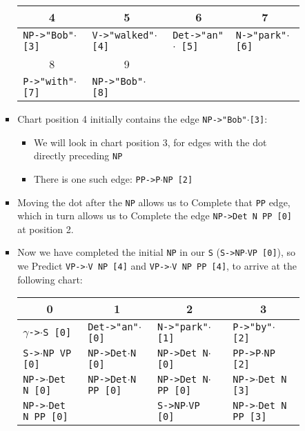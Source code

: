 \documentclass[a4paper]{article}
\begin{document}
\begin{enumerate}
\begin{enumerate}
\begin{enumerate}
\begin{itemize}
\begin{table}[ht]
\begin{tabular}{l|l|l|l}
\hline
\multicolumn{1}{c}{4} & \multicolumn{1}{c}{5} & \multicolumn{1}{c}{6} & \multicolumn{1}{c}{7} \\
\hline
\texttt{NP->"Bob"}$\cdot$\texttt{ [3]} & \texttt{V->"walked"}$\cdot$\texttt{ [4]} & \texttt{Det->"an"}$\cdot$\texttt{ [5]} & \texttt{N->"park"}$\cdot$\texttt{ [6]} \\
\hline
\multicolumn{1}{c}{8} & \multicolumn{1}{c}{9} & \multicolumn{1}{c}{} & \\
\hline
\texttt{P->"with"}$\cdot$\texttt{ [7]} & \texttt{NP->"Bob"}$\cdot$\texttt{ [8]} & & \\
\hline
\end{tabular}
\end{table}
\item Chart position 4 initially contains the edge \texttt{NP->"Bob"}$\cdot$\texttt{[3]}:
\begin{itemize}
\item We will look in chart position 3, for edges with the dot directly preceding \texttt{NP}
\item There is one such edge: \texttt{PP->P}$\cdot$\texttt{NP [2]}
\end{itemize}
\item Moving the dot after the \texttt{NP} allows us to Complete that \texttt{PP} edge, which in turn allows us to Complete the edge \texttt{NP->Det N PP [0]} at position 2.
\item Now we have completed the initial \texttt{NP} in our \texttt{S} (\texttt{S->NP}$\cdot$\texttt{VP [0]}), so we Predict \texttt{VP->}$\cdot$\texttt{V NP [4]} and \texttt{VP->}$\cdot$\texttt{V NP PP [4]}, to arrive at the following chart:
\begin{table}[ht]
\centering
\begin{tabular}{l|l|l|l}
\multicolumn{1}{c}{0} & \multicolumn{1}{c}{1} &\multicolumn{1}{c}{2} & \multicolumn{1}{c}{3} \\
\hline
$\gamma$\texttt{->}$\cdot$\texttt{S [0]} & \texttt{Det->"an"}$\cdot$\texttt{ [0]} & \texttt{N->"park"}$\cdot$\texttt{ [1]} & \texttt{P->"by"}$\cdot$\texttt{ [2]} \\
\texttt{S->}$\cdot$\texttt{NP VP [0]} & \texttt{NP->Det}$\cdot$\texttt{N [0]} & \texttt{NP->Det N}$\cdot$\texttt{ [0]} & \texttt{PP->P}$\cdot$\texttt{NP [2]} \\
\texttt{NP->}$\cdot$\texttt{Det N [0]} & \texttt{NP->Det}$\cdot$\texttt{N PP [0]} & \texttt{NP->Det N}$\cdot$\texttt{PP [0]} & \texttt{NP->}$\cdot$\texttt{Det N [3]} \\
\texttt{NP->}$\cdot$\texttt{Det N PP [0]} & & \texttt{S->NP}$\cdot$\texttt{VP [0]} & \texttt{NP->}$\cdot$\texttt{Det N PP [3]} \\

\end{tabular}
\end{table}
\end{itemize}
\end{enumerate}
\end{enumerate}
\end{enumerate}
\end{document}
